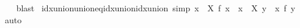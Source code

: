 \begin{isabellebody}
%
\isadelimproof
\ \ %
\endisadelimproof
%
\isatagproof
{}\isamarkupfalse%
\ blast%
\endisatagproof
{\isafoldproof}%
%
\isadelimproof
\isanewline
%
\endisadelimproof
\isanewline
{}\isamarkupfalse%
\ idx{\isacharunderscore}{\kern0pt}union{\isacharunderscore}{\kern0pt}union{\isacharunderscore}{\kern0pt}eq{\isacharunderscore}{\kern0pt}idx{\isacharunderscore}{\kern0pt}union{\isacharunderscore}{\kern0pt}idx{\isacharunderscore}{\kern0pt}union\ {\isacharbrackleft}{\kern0pt}simp{\isacharbrackright}{\kern0pt}{\isacharcolon}{\kern0pt}\ {\isachardoublequoteopen}{\isacharparenleft}{\kern0pt}{\isasymUnion}x\ {\isasymin}\ {\isasymUnion}X{\isachardot}{\kern0pt}\ f\ x{\isacharparenright}{\kern0pt}\ {\isacharequal}{\kern0pt}\ {\isacharparenleft}{\kern0pt}{\isasymUnion}x\ {\isasymin}\ X{\isachardot}{\kern0pt}\ {\isasymUnion}y\ {\isasymin}\ x{\isachardot}{\kern0pt}\ f\ y{\isacharparenright}{\kern0pt}{\isachardoublequoteclose}\isanewline
%
\isadelimproof
\ \ %
\endisadelimproof
%
\isatagproof
{}\isamarkupfalse%
\ auto%
\endisatagproof
{\isafoldproof}%
%
\isadelimproof
\isanewline
%
\endisadelimproof
\isanewline
%
\isadelimtheory
\isanewline
%
\endisadelimtheory
%
\isatagtheory
{}\isamarkupfalse%
%
\endisatagtheory
{\isafoldtheory}%
%
\isadelimtheory
%
\endisadelimtheory
%
\end{isabellebody}%
\endinput
